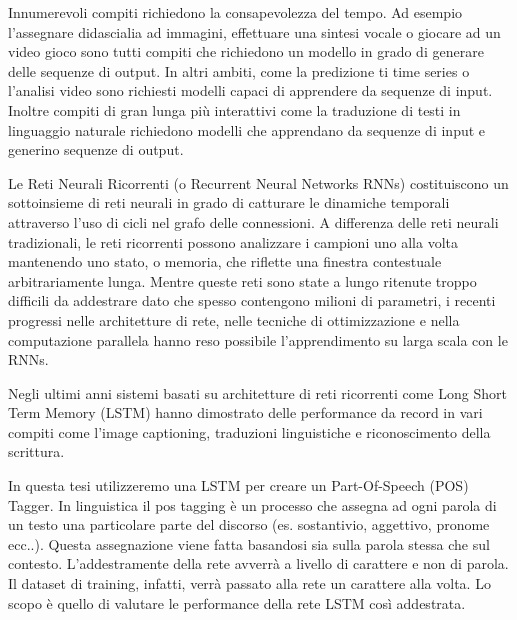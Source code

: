 Innumerevoli compiti richiedono la consapevolezza del tempo. Ad esempio l'assegnare didascialia ad immagini, effettuare una sintesi vocale o giocare ad un video gioco sono tutti compiti che richiedono un modello in grado di generare delle sequenze di output. In altri ambiti, come la predizione ti time series o l'analisi video sono richiesti modelli capaci di apprendere da sequenze di input. Inoltre compiti di gran lunga pi\`u interattivi come la traduzione di testi in linguaggio naturale richiedono modelli che apprendano da sequenze di input e generino sequenze di output.


Le Reti Neurali Ricorrenti (o Recurrent Neural Networks RNNs) costituiscono un sottoinsieme di reti neurali in grado di catturare le dinamiche temporali attraverso l'uso di cicli nel grafo delle connessioni. A differenza delle reti neurali tradizionali, le reti ricorrenti possono analizzare i campioni uno alla volta mantenendo uno stato, o memoria, che riflette una finestra contestuale arbitrariamente lunga. Mentre queste reti sono state a lungo ritenute troppo difficili da addestrare dato che spesso contengono milioni di parametri, i recenti progressi nelle architetture di rete, nelle tecniche di ottimizzazione e nella computazione parallela hanno reso possibile l'apprendimento su larga scala con le RNNs.


Negli ultimi anni sistemi basati su architetture di reti ricorrenti come Long Short Term Memory (LSTM) hanno dimostrato delle performance da record in vari compiti come l'image captioning, traduzioni linguistiche e riconoscimento della scrittura.


In questa tesi utilizzeremo una LSTM per creare un Part-Of-Speech (POS) Tagger. In linguistica il pos tagging \`e un processo che assegna ad ogni parola di un testo una particolare parte del discorso (es. sostantivio, aggettivo, pronome ecc..). Questa assegnazione viene fatta basandosi sia sulla parola stessa che sul contesto. L'addestramente della rete avverr\`a a livello di carattere e non di parola. Il dataset di training, infatti, verr\`a passato alla rete un carattere alla volta. Lo scopo \`e quello di valutare le performance della rete LSTM cos\`i addestrata.
